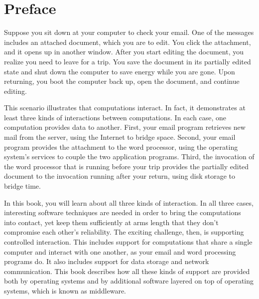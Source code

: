 \chapter*{Preface}

Suppose you
sit down at your computer to check your email. One of the messages
includes an attached document, which you are to edit.  You click
the attachment, and it opens up in another window.  After you start
editing the document, you realize you need to leave for a trip.  You
save the document in its partially edited state and shut down the
computer to save energy while you are gone.  Upon returning, you boot
the computer back up, open the document, and continue editing.

This scenario illustrates that computations interact.  In fact, it demonstrates at least three kinds of interactions
between computations.  In each case, one computation provides data to
another.  First, your email program retrieves new mail from the
server, using the Internet to bridge space.  Second, your email
program provides the attachment to the word processor, using the
operating system's services to couple the two application programs.
Third, the invocation of the
word processor that is running before your trip provides the partially edited
document to the invocation running after your return, using disk
storage to bridge time.

In this book, you will learn about all three kinds of interaction.  In
all three cases, interesting software techniques are needed in order
to bring the computations into contact, yet keep them sufficiently at
arms length that they don't compromise each other's reliability.
The exciting challenge, then, is supporting controlled interaction.
This includes support for computations that share a single computer
and interact with one another, as your email and word processing
programs do.  It also includes support for data storage and network
communication.  This book describes how all these kinds of support are
provided both by operating systems and by additional software layered
on top of operating systems, which is known as middleware.

